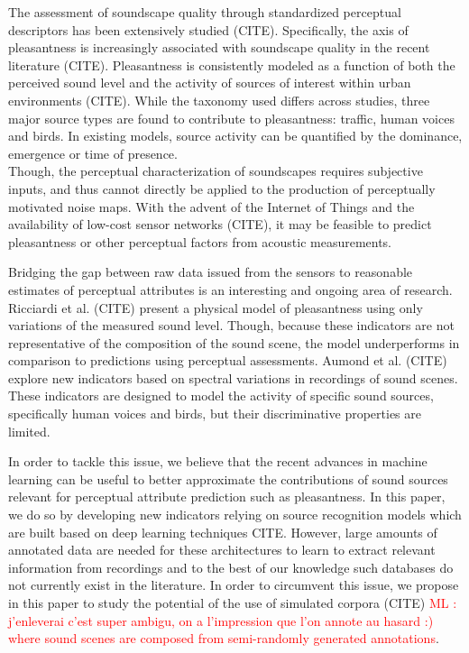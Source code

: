 \documentclass[11pt,a4paper]{article}
\newcommand{\ml}[1]{\textcolor{red}{ML : #1}}
\begin{document}
The assessment of soundscape quality through standardized perceptual descriptors has been extensively studied (CITE). Specifically, the axis of pleasantness is increasingly associated with soundscape quality in the recent literature (CITE). Pleasantness is consistently modeled as a function of both the perceived sound level and the activity of sources of interest within urban environments (CITE). While the taxonomy used differs across studies, three major source types are found to contribute to pleasantness: traffic, human voices and birds. In existing models, source activity can be quantified by the dominance, emergence or time of presence.\\

Though, the perceptual characterization of soundscapes requires subjective inputs, and thus cannot directly be applied to the production of perceptually motivated noise maps. With the advent of the Internet of Things and the availability of low-cost sensor networks (CITE), it may be feasible to predict pleasantness or other perceptual factors from acoustic measurements.

Bridging the gap between raw data issued from the sensors to reasonable estimates of perceptual attributes is an interesting and ongoing area of research. Ricciardi et al. (CITE) present a physical model of pleasantness using only variations of the measured sound level. Though, because these indicators are not representative of the composition of the sound scene, the model underperforms in comparison to predictions using perceptual assessments. Aumond et al. (CITE) explore new indicators based on spectral variations in recordings of sound scenes. These indicators are designed to model the activity of specific sound sources, specifically human voices and birds, but their discriminative properties are limited.

In order to tackle this issue, we believe that the recent advances in machine learning can be useful to better approximate the contributions of sound sources relevant for perceptual attribute prediction such as pleasantness. In this paper, we do so by developing new indicators relying on source recognition models which are built based on deep learning techniques CITE. However, large amounts of annotated data are needed for these architectures to learn to extract relevant information from recordings and to the best of our knowledge such databases do not currently exist in the literature. In order to circumvent this issue, we propose in this paper to study the potential of the use of simulated corpora (CITE) \ml{j'enleverai c'est super ambigu, on a l'impression que l'on annote au hasard :) where sound scenes are composed from semi-randomly generated annotations}.
\end{document}
